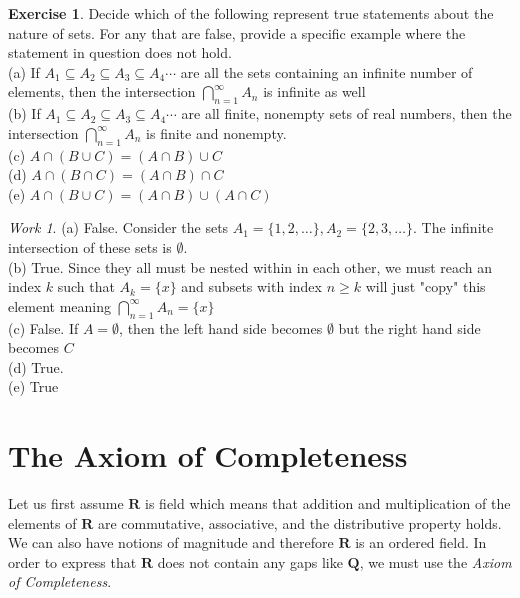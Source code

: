 \documentclass[12pt,letterpaper]{report}
\theoremstyle{definition}
\newtheorem{exercise}{Exercise}[section]
\theoremstyle{remark}
\newtheorem*{work}{Work}
\newcommand{\R}{\mathbf{R}}
\newcommand{\Q}{\mathbf{Q}}
\begin{document}
\begin{exercise}
Decide which of the following represent true statements about
the nature of sets. For any that are false, provide a specific example where the statement in question does not hold.\\
(a) If $A_1 \subseteq A_2 \subseteq A_3 \subseteq A_4 
 \cdots$ are all the sets containing an infinite number of elements, then the intersection $\bigcap^\infty_{n=1} A_n$ is infinite as well \\
 (b) If $A_1 \subseteq A_2 \subseteq A_3 \subseteq A_4 
 \cdots$ are all finite, nonempty sets of real numbers, then the intersection $\bigcap^\infty_{n=1} A_n$ is finite and nonempty.\\
 (c) $A \cap (B \cup C)  = ( A \cap B ) \cup C $ \\
 (d) $A \cap (B \cap C) = (A \cap B) \cap C$ \\
 (e) $A \cap (B \cup C) = (A \cap B) \cup (A \cap C)$
\end{exercise}
\begin{work}
    (a) False. Consider the sets $A_1 = \{1,2,\ldots\}, A_2 = \{2,3,\ldots\}$. The infinite intersection of these sets is $\emptyset$.\\
    (b) True. Since they all must be nested within in each other, we must reach an index $k$ such that $A_k = \{x\}$ and subsets with index $n \geq k$ will just "copy" this element meaning $\bigcap^{\infty}_{n=1}A_n = \{x\}$ \\
    (c) False. If $A = \emptyset$, then the left hand side becomes $\emptyset$ but the right hand side becomes $C$\\
    (d) True. \\
    (e) True
    
\end{work}







\section{The Axiom of Completeness}
Let us first assume $\R$ is field which means that addition and multiplication of the elements of $\R$ are commutative, associative, and the distributive property holds. We can also have notions of magnitude and therefore $\R$ is an ordered field. In order to express that $\R$ does not contain any gaps like $\Q$, we must use the \textit{Axiom of Completeness}.
\end{document}
